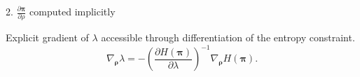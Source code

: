 \documentclass[10pt,aspectratio=169]{beamer}
\begin{document}
\begin{frame}{2. $\frac{\partial \mathbf{\pi}}{\partial \rho}$ computed implicitly}

    Explicit gradient of $\lambda$ accessible through differentiation of the entropy constraint.
    \begin{equation}
        \nabla_{\bm{\rho}} \lambda =  -\left( \frac{\partial  H(\bm{\pi})}{\partial \lambda}\right)^{-1} \nabla_{\bm{\rho}} H (\bm{\pi}) .
    \end{equation}

\end{frame}



    
    
\end{document}
